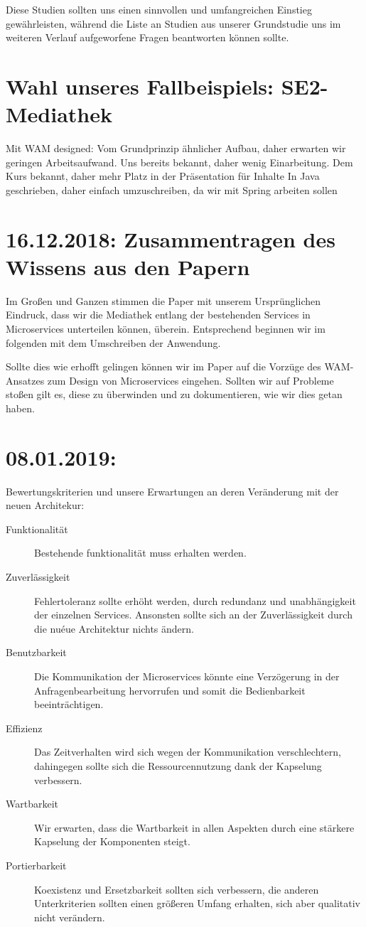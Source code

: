\documentclass{article}
\begin{document}
Diese Studien sollten uns einen sinnvollen und umfangreichen Einstieg gewährleisten, während die Liste an Studien aus unserer Grundstudie uns im weiteren Verlauf aufgeworfene Fragen beantworten können sollte.

\section{Wahl unseres Fallbeispiels: SE2-Mediathek}

Mit WAM designed: Vom Grundprinzip ähnlicher Aufbau, daher erwarten wir geringen Arbeitsaufwand.
Uns bereits bekannt, daher wenig Einarbeitung.
Dem Kurs bekannt, daher mehr Platz in der Präsentation für Inhalte
In Java geschrieben, daher einfach umzuschreiben, da wir mit Spring arbeiten sollen


\section{16.12.2018: Zusammentragen des Wissens aus den Papern}

Im Großen und Ganzen stimmen die Paper mit unserem Ursprünglichen Eindruck, dass wir die Mediathek entlang der bestehenden Services in Microservices unterteilen können, überein.
Entsprechend beginnen wir im folgenden mit dem Umschreiben der Anwendung.

Sollte dies wie erhofft gelingen können wir im Paper auf die Vorzüge des WAM-Ansatzes zum Design von Microservices eingehen. Sollten wir auf Probleme stoßen gilt es, diese zu überwinden und zu dokumentieren, wie wir dies getan haben.

\section{08.01.2019:}

Bewertungskriterien und unsere Erwartungen an deren Veränderung mit der neuen Architekur:
\begin{description}
    \item[Funktionalität] Bestehende funktionalität muss erhalten werden.
    \item[Zuverlässigkeit] Fehlertoleranz sollte erhöht werden, durch redundanz und unabhängigkeit der einzelnen Services. Ansonsten sollte sich an der Zuverlässigkeit durch die nuéue Architektur nichts ändern.
    \item[Benutzbarkeit] Die Kommunikation der Microservices könnte eine Verzögerung in der Anfragenbearbeitung hervorrufen und somit die Bedienbarkeit beeinträchtigen.
    \item[Effizienz] Das Zeitverhalten wird sich wegen der Kommunikation verschlechtern, dahingegen sollte sich die Ressourcennutzung dank der Kapselung verbessern.
    \item[Wartbarkeit] Wir erwarten, dass die Wartbarkeit in allen Aspekten durch eine stärkere Kapselung der Komponenten steigt.
    \item[Portierbarkeit] Koexistenz und Ersetzbarkeit sollten sich verbessern, die anderen Unterkriterien sollten einen größeren Umfang erhalten, sich aber qualitativ nicht verändern.
\end{description}
\end{document}
